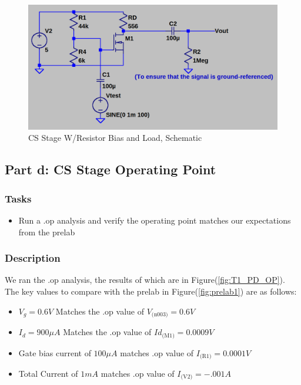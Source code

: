 \documentclass[11pt]{article}
\begin{document}
	\begin{figure}[h]
		\centering
		\includegraphics[width=0.85\linewidth]{task_1_c-e_schematic}
		\caption{CS Stage W/Resistor Bias and Load, Schematic}
		\label{fig:T1_PC_SCHEMATIC}
		\vspace{1mm}
	\end{figure}
	
	\subsection{Part d: CS Stage Operating Point}
		\subsubsection{Tasks}
		\begin{itemize}
			\item Run a .op analysis and verify the operating point matches our expectations from the prelab
		\end{itemize}
		
		\subsubsection{Description}
		We ran the .op analysis, the results of which are in Figure(\ref{fig:T1_PD_OP}). The key values to compare with the prelab in Figure(\ref{fig:prelab1}) are as follows:
		\begin{itemize}
			\item $V_g = 0.6V$ Matches the .op value of $V_\text{(n003)} = 0.6V$
			\item $I_d = 900\mu A$ Matches the .op value of $Id_\text{(M1)} = 0.0009V$
			\item Gate bias current of $100\mu A$ matches .op value of $I_\text{(R1)} = 0.0001V$
			\item Total Current of $1mA$ matches .op value of $I_\text{(V2)} = -.001 A$
		\end{itemize}
		
\end{document}
